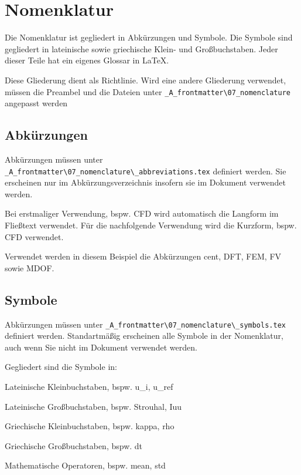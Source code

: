 \chapter{Nomenklatur}

Die Nomenklatur ist gegliedert in Abkürzungen und Symbole. Die Symbole sind gegliedert in lateinische sowie griechische Klein- und Großbuchstaben. Jeder dieser Teile hat ein eigenes Glossar in LaTeX. 

Diese Gliederung dient als Richtlinie. Wird eine andere Gliederung verwendet, müssen die Preambel und die Dateien unter \lstinline[basicstyle=\ttfamily]|_A_frontmatter\07_nomenclature| angepasst werden

\section{Abkürzungen}
Abkürzungen müssen unter \lstinline[basicstyle=\ttfamily]|_A_frontmatter\07_nomenclature\_abbreviations.tex| definiert werden. Sie erscheinen nur im Abkürzungsverzeichnis insofern sie im Dokument verwendet werden. 

Bei erstmaliger Verwendung, bspw. \gls{CFD} wird automatisch die Langform im Fließtext verwendet. Für die nachfolgende Verwendung wird die Kurzform, bspw. \gls{CFD} verwendet.

Verwendet werden in diesem Beispiel die Abkürzungen \gls{cent}, \gls{DFT}, \gls{FEM}, \gls{FV} sowie \gls{MDOF}.

\section{Symbole}

Abkürzungen müssen unter \lstinline[basicstyle=\ttfamily]|_A_frontmatter\07_nomenclature\_symbols.tex| definiert werden. Standartmäßig erscheinen alle Symbole in der Nomenklatur, auch wenn Sie nicht im Dokument verwendet werden. 

Gegliedert sind die Symbole in:

Lateinische Kleinbuchstaben, bspw. \gls{u_i}, \gls{u_ref}

Lateinische Großbuchstaben, bspw. \gls{Strouhal}, \gls{Iuu}

Griechische Kleinbuchstaben, bspw. \gls{kappa}, \gls{rho}

Griechische Großbuchstaben, bspw. \gls{dt}

Mathematische Operatoren, bspw. \gls{mean}, \gls{std} 

\newpage

